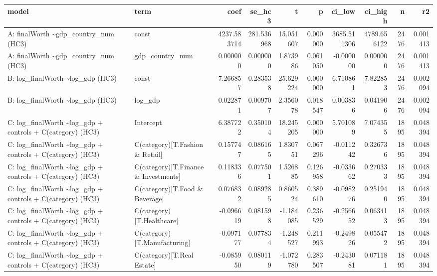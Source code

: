 \begin{tabular}{llrrrrrrrr}
\toprule
model & term & coef & se\_hc3 & t & p & ci\_low & ci\_high & n & r2 \\
\midrule
A: finalWorth \textasciitilde \space gdp\_country\_num (HC3) & const & 4237.583714 & 281.536968 & 15.051607 & 0.000000 & 3685.511306 & 4789.656122 & 2476 & 0.001413 \\
A: finalWorth \textasciitilde \space gdp\_country\_num (HC3) & gdp\_country\_num & 0.000000 & 0.000000 & 1.873986 & 0.061050 & -0.000000 & 0.000000 & 2476 & 0.001413 \\
B: log\_finalWorth \textasciitilde \space log\_gdp (HC3) & const & 7.266857 & 0.283538 & 25.629224 & 0.000000 & 6.710861 & 7.822853 & 2476 & 0.002094 \\
B: log\_finalWorth \textasciitilde \space log\_gdp (HC3) & log\_gdp & 0.022871 & 0.009707 & 2.356078 & 0.018547 & 0.003836 & 0.041906 & 2476 & 0.002094 \\
C: log\_finalWorth \textasciitilde \space log\_gdp + controls + C(category) (HC3) & Intercept & 6.387722 & 0.350104 & 18.245205 & 0.000000 & 5.701089 & 7.074355 & 1895 & 0.048394 \\
C: log\_finalWorth \textasciitilde \space log\_gdp + controls + C(category) (HC3) & C(category)[T.Fashion \& Retail] & 0.157747 & 0.086165 & 1.830751 & 0.067296 & -0.011242 & 0.326736 & 1895 & 0.048394 \\
C: log\_finalWorth \textasciitilde \space log\_gdp + controls + C(category) (HC3) & C(category)[T.Finance \& Investments] & 0.118336 & 0.077501 & 1.526885 & 0.126958 & -0.033662 & 0.270333 & 1895 & 0.048394 \\
C: log\_finalWorth \textasciitilde \space log\_gdp + controls + C(category) (HC3) & C(category)[T.Food \& Beverage] & 0.076832 & 0.089285 & 0.860524 & 0.389610 & -0.098276 & 0.251940 & 1895 & 0.048394 \\
C: log\_finalWorth \textasciitilde \space log\_gdp + controls + C(category) (HC3) & C(category)[T.Healthcare] & -0.096619 & 0.081598 & -1.184085 & 0.236529 & -0.256652 & 0.063413 & 1895 & 0.048394 \\
C: log\_finalWorth \textasciitilde \space log\_gdp + controls + C(category) (HC3) & C(category)[T.Manufacturing] & -0.097177 & 0.077834 & -1.248527 & 0.211993 & -0.249826 & 0.055472 & 1895 & 0.048394 \\
C: log\_finalWorth \textasciitilde \space log\_gdp + controls + C(category) (HC3) & C(category)[T.Real Estate] & -0.085950 & 0.080119 & -1.072780 & 0.283507 & -0.243081 & 0.071181 & 1895 & 0.048394 \\

\end{tabular}
